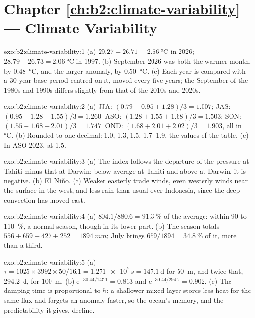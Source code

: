 \section*{Chapter \ref{ch:b2:climate-variability} --- Climate Variability}

\begin{solution}{exo:b2:climate-variability:1}
(a) $29.27 - 26.71 = \qty{2.56}{\celsius}$ in 2026; $28.79 - 26.73 = \qty{2.06}{\celsius}$ in 1997.
(b) September 2026 was both the warmer month, by \qty{0.48}{\celsius}, and the larger anomaly, by
\qty{0.50}{\celsius}. (c) Each year is compared with a 30-year base period centred on it, moved
every five years; the September  of the 1980s and 1990s differs slightly from that of
the 2010s and 2020s.
\end{solution}

\begin{solution}{exo:b2:climate-variability:2}
(a) JJA: $(0.79 + 0.95 + 1.28)/3 = 1.007$; JAS: $(0.95 + 1.28 + 1.55)/3 = 1.260$; ASO: $(1.28 +
1.55 + 1.68)/3 = 1.503$; SON: $(1.55 + 1.68 + 2.01)/3 = 1.747$; OND: $(1.68 + 2.01 + 2.02)/3 =
1.903$, all in \unit{\celsius}. (b) Rounded to one decimal: 1.0, 1.3, 1.5, 1.7, 1.9, the values of
the table. (c) In ASO 2023, at 1.5.
\end{solution}

\begin{solution}{exo:b2:climate-variability:3}
(a) The index follows the departure of the pressure at Tahiti minus that at Darwin: below average
at Tahiti and above at Darwin, it is negative. (b) El~Niño. (c) Weaker easterly trade winds, even
westerly winds near the surface in the west, and less rain than usual over Indonesia, since the
deep convection has moved east.
\end{solution}

\begin{solution}{exo:b2:climate-variability:4}
(a) $804.1/880.6 = \qty{91.3}{\percent}$ of the average: within 90 to \qty{110}{\percent}, a
normal season, though in its lower part. (b) The season totals $556 + 659 + 427 + 252 =
\qty{1894}{mm}$; July brings $659/1894 = \qty{34.8}{\percent}$ of it, more than a third.
\end{solution}

\begin{solution}{exo:b2:climate-variability:5}
(a) $\tau = 1025 \times 3992 \times 50/16.1 = \qty{1.271e7}{s} = \qty{147.1}{\day}$ for
\qty{50}{m}, and twice that, \qty{294.2}{\day}, for \qty{100}{m}. (b) $\mathrm{e}^{-30.44/147.1} =
0.813$ and $\mathrm{e}^{-30.44/294.2} = 0.902$. (c) The damping time is proportional to $h$: a
shallower mixed layer stores less heat for the same flux and forgets an anomaly faster, so the
ocean's memory, and the predictability it gives, decline.
\end{solution}

